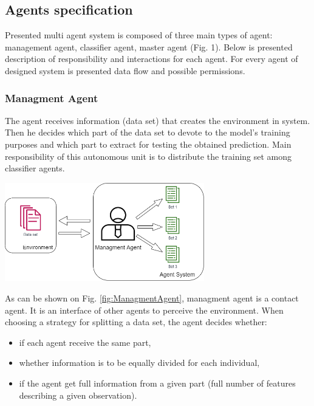 \subsection{Agents specification}

Presented multi agent system is composed of three main types of agent: management agent, classifier agent, master agent (Fig. 1). Below is presented description of responsibility and interactions for each agent. For every agent of designed system is presented data flow and possible permissions.

\subsubsection{Managment Agent}

The agent receives information (data set) that creates the environment in system. Then he decides which part of the data set to devote to the model's training purposes and which part to extract for testing the obtained prediction. Main responsibility of this autonomous unit is to distribute the training set among classifier agents. 

\begin{center}
	\includegraphics[width=0.65\textwidth, keepaspectratio]{diagrams/managment-agent}
	\center
	\label{fig:ManagmentAgent}
\end{center}

As can be shown on Fig. \ref{fig:ManagmentAgent}, managment agent is a contact agent. It is an interface of other agents to perceive the environment. When choosing a strategy for splitting a data set, the agent decides whether:
 
\begin{itemize}
	\item if each agent receive the same part, 
	\item whether information is to be equally divided for each individual, 
	\item if the agent get full information from a given part (full number of features describing a given observation).
\end{itemize}

